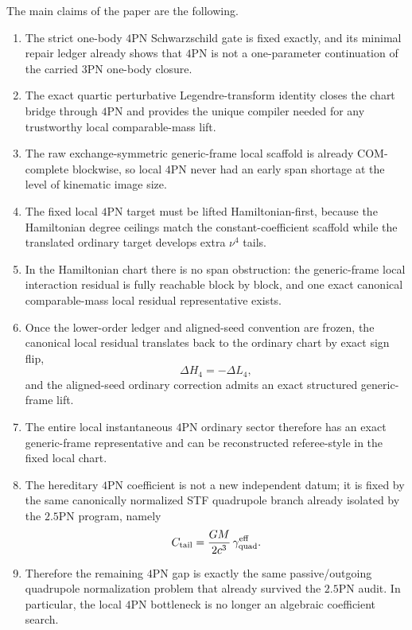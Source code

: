 \documentclass[11pt]{article}
\begin{document}
The main claims of the paper are the following.
\begin{enumerate}
  \item The strict one-body $4$PN Schwarzschild gate is fixed exactly, and its
  minimal repair ledger already shows that $4$PN is not a one-parameter
  continuation of the carried $3$PN one-body closure.

  \item The exact quartic perturbative Legendre-transform identity closes the
  chart bridge through $4$PN and provides the unique compiler
  needed for any trustworthy local comparable-mass lift.

  \item The raw exchange-symmetric generic-frame local scaffold is already
  COM-complete blockwise, so local $4$PN never had an early span shortage at the
  level of kinematic image size.

  \item The fixed local $4$PN target must be lifted Hamiltonian-first, because
  the Hamiltonian degree ceilings match the constant-coefficient scaffold while
  the translated ordinary target develops extra $\nu^4$ tails.

  \item In the Hamiltonian chart there is no span obstruction: the generic-frame
  local interaction residual is fully reachable block by block, and one exact
  canonical comparable-mass local residual representative exists.

  \item Once the lower-order ledger and aligned-seed convention are frozen, the
  canonical local residual translates back to the ordinary chart by exact sign
  flip,
  \[
  \Delta H_4=-\Delta L_4,
  \]
  and the aligned-seed ordinary correction admits an exact structured
  generic-frame lift.

  \item The entire local instantaneous $4$PN ordinary sector therefore has an
  exact generic-frame representative and can be reconstructed referee-style in
  the fixed local chart.

  \item The hereditary $4$PN coefficient is not a new independent datum; it is
  fixed by the same canonically normalized STF quadrupole branch already
  isolated by the $2.5$PN program, namely
  \[
  C_{\rm tail}=\frac{GM}{2c^3}\,\gamma_{\rm quad}^{\rm eff}.
  \]

  \item Therefore the remaining $4$PN gap is exactly the same
  passive/outgoing quadrupole normalization problem that already survived the
  $2.5$PN audit.  In particular, the local $4$PN bottleneck is no longer an
  algebraic coefficient search.
\end{enumerate}
\end{document}
